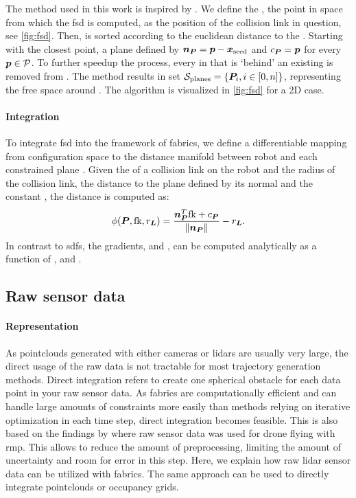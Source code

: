 The method used in this work is inspired by \cite{Liu2017a}. We define the
\seed{}, the point in space from which the \ac{fsd} is
computed, 
as the position of the collision link in question, see
\cref{fig:fsd}. Then,
\pointcloud{} is sorted according to the euclidean distance to the \seed{}.
Starting with the closest point, a plane \plane{} defined by $\bm{n}_{\bm{P}} = \bm{p} -
\bm{x}_{\textrm{seed}}$ and $c_{\bm{P}} = \bm{p}$ for every $\bm{p} \in \mathcal{P}$. To further
speedup the process, every \point{} in \pointcloud{} that is `behind' an
existing \plane{} is removed from \pointcloud{}. The method results in set
$\mathcal{S}_{\textrm{planes}} = \{\bm{P}_i, i\in[0,n]\}$, representing the free
space around \seed{}. The algorithm is visualized in \cref{fig:fsd} for a 2D
case.

\paragraph{Integration}
To integrate \ac{fsd} into the framework of \ac{fabrics}, we
define a differentiable mapping from configuration space \Q{} to the distance
manifold between robot and each constrained plane \plane{}.
Given the \fk{} of a collision link on the robot and the radius of the
collision link, the distance to the plane \plane{} defined by its normal
\np{} and the constant \cp{}, the distance is computed as:
\begin{equation}
  \phi({\bm{P},\textrm{fk},r_{\bm{L}}}) = \frac{\bm{n}_{\bm{P}}^T\textrm{fk} + c_{\bm{P}}}{\left\lVert\bm{n}_{\bm{P}}\right\rVert} - r_{\bm{L}}
  \label{eq:point_plane_distance}.
\end{equation}
In contrast to \acp{sdf}, the gradients, \J{} and \Jdot{}, can be
computed analytically as a function of \q{}, \np{} and \cp{}.



\subsection{Raw sensor data}
\label{sub:raw_sensor_data}

\paragraph{Representation}
As pointclouds generated with either cameras or lidars are
usually very large, the direct usage of the raw data is not
tractable for most trajectory generation methods. Direct
integration refers to create one spherical obstacle for each
data point in your raw sensor data. As \ac{fabrics} are
computationally efficient and can handle large amounts of
constraints more easily than methods relying on iterative
optimization in each time step\cite{Spahn2023}, direct
integration becomes feasible. This is also based on the
findings by \cite{Pantic2023obstacle} where raw sensor data
was used for drone flying with \ac{rmp}. This allows to
reduce the amount of preprocessing, limiting the amount of
uncertainty and room for error in this step. Here, we
explain how raw lidar sensor data can be utilized with
\ac{fabrics}. The same approach can be used to directly
integrate pointclouds or occupancy grids.

